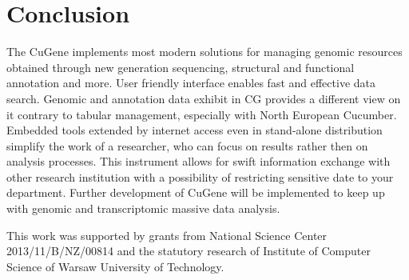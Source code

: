 \documentclass[a4paper]{spie}
\newcommand{\appName}{CuGene}
\newcommand{\appShortcut}{CG}
\begin{document}
\section{Conclusion}

The \appName{} implements most modern solutions for managing genomic resources obtained through new generation sequencing,
structural and functional annotation and more.
User friendly interface enables fast and effective data search.
Genomic and annotation data exhibit in \appShortcut{} provides a different view on it contrary to tabular management, especially with North European Cucumber.
Embedded tools extended by internet access even in stand-alone distribution simplify the work of a researcher,
who can focus on results rather then on analysis processes.
This instrument allows for swift information exchange with other research institution with a possibility of restricting sensitive date to your department.
Further development of \appName{} will be implemented to keep up with genomic and transcriptomic massive data analysis.

\acknowledgments

This work was supported by grants from National Science Center 2013/11/B/NZ/00814 and the statutory research of Institute of Computer Science of Warsaw University of Technology.



\end{document}

